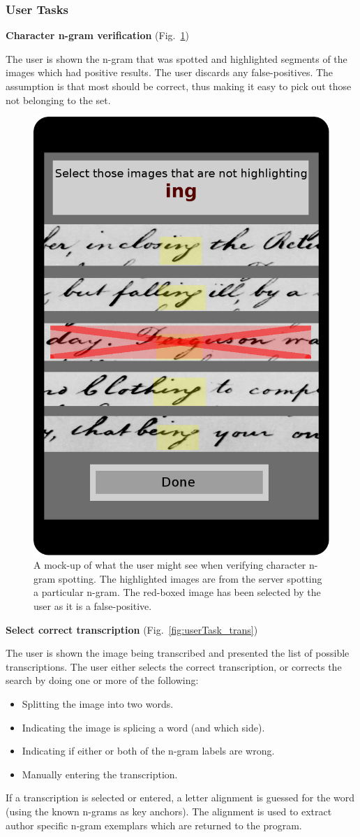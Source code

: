 \documentclass[ms]{byuprop}
\begin{document}
\subsubsection{User Tasks}

{\setlength{\parindent}{0cm}
\textbf{Character n-gram verification} (Fig.~\ref{fig:userTask_spot})

\begin{addmargin}[3em]{3em}
The user is shown the n-gram that was spotted and highlighted segments of the images which had positive results. The user discards any false-positives. The assumption is that most should be correct, thus making it easy to pick out those not belonging to the set.
\\[.5cm]
\end{addmargin}

\begin{figure}[h]
    \centering
    \includegraphics[width=.4\textwidth]{userTask_spot}
    \caption{A mock-up of what the user might see when verifying character n-gram spotting. The highlighted images are from the server spotting a particular n-gram. The red-boxed image has been selected by the user as it is a false-positive.}
    \label{fig:userTask_spot}
\end{figure}

\textbf{Select correct transcription} (Fig.~\ref{fig:userTask_trans})

\begin{addmargin}[3em]{3em}
The user is shown the image being transcribed and presented the list of possible transcriptions. The user either selects the correct transcription, or corrects the search by doing one or more of the following:
\begin{itemize}
    \item Splitting the image into two words.
    \item Indicating the image is splicing a word (and which side).
    \item Indicating if either or both of the n-gram labels are wrong.
    \item Manually entering the transcription.
\end{itemize}
If a transcription is selected or entered, a letter alignment is guessed for the word (using the known n-grams as key anchors). The alignment is used to extract author specific n-gram exemplars which are returned to the program.
\\[.5cm]
\end{addmargin}
}
\end{document}
